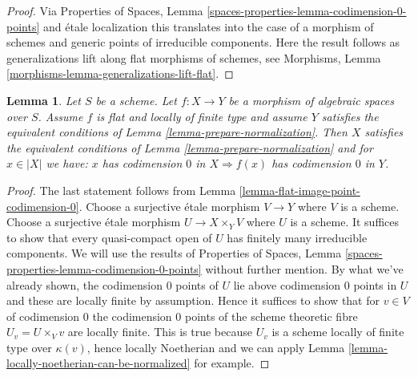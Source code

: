 \documentclass{stacks-project}
\theoremstyle{plain}
\newtheorem{lemma}[subsection]{Lemma}
\theoremstyle{definition}
\theoremstyle{remark}
\numberwithin{equation}{subsection}
\begin{document}
\begin{proof}
Via Properties of Spaces, Lemma
\ref{spaces-properties-lemma-codimension-0-points} and \'etale localization
this translates into the case of a morphism of schemes and generic points
of irreducible components. Here the result follows as generalizations lift
along flat morphisms of schemes, see
Morphisms, Lemma \ref{morphisms-lemma-generalizations-lift-flat}.
\end{proof}

\begin{lemma}
\label{lemma-flat-locally-finite-type-points-codimension-0}
Let $S$ be a scheme. Let $f : X \to Y$ be a morphism of algebraic
spaces over $S$. Assume $f$ is flat and locally of finite type and
assume $Y$ satisfies the equivalent conditions of
Lemma \ref{lemma-prepare-normalization}.
Then $X$ satisfies the equivalent conditions of
Lemma \ref{lemma-prepare-normalization} and for $x \in |X|$ we have:
$x$ has codimension $0$ in $X \Rightarrow f(x)$ has codimension $0$ in $Y$.
\end{lemma}

\begin{proof}
The last statement follows from
Lemma \ref{lemma-flat-image-point-codimension-0}.
Choose a surjective \'etale morphism $V \to Y$ where $V$ is a scheme.
Choose a surjective \'etale morphism $U \to X \times_Y V$ where $U$
is a scheme. It suffices to show that every quasi-compact open
of $U$ has finitely many irreducible components.
We will use the results of
Properties of Spaces, Lemma \ref{spaces-properties-lemma-codimension-0-points}
without further mention. By what we've
already shown, the codimension $0$ points of $U$ lie above
codimension $0$ points in $U$ and these are locally finite by
assumption. Hence it suffices to show that for $v \in V$ of codimension $0$
the codimension $0$ points of the scheme theoretic fibre $U_v = U \times_V v$
are locally finite. This is true because $U_v$ is a scheme
locally of finite type over $\kappa(v)$, hence locally Noetherian
and we can apply Lemma \ref{lemma-locally-noetherian-can-be-normalized}
for example.
\end{proof}
\end{document}
